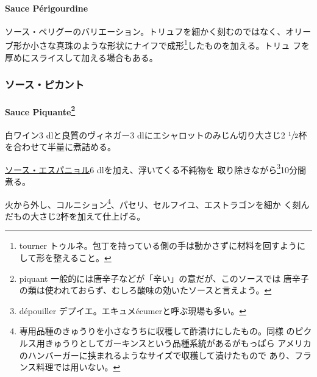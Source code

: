 \hypertarget{sauce-puxe9rigourdine}{%
\paragraph{Sauce Périgourdine}\label{sauce-puxe9rigourdine}}


ソース・ペリグーのバリエーション。トリュフを細かく刻むのではなく、オリー
ブ形か小さな真珠のような形状にナイフで成形\footnote{tourner
  トゥルネ。包丁を持っている側の手は動かさずに材料を回すようにして形を整えること。}したものを加える。トリュ
フを厚めにスライスして加える場合もある。

\maeaki

\hypertarget{ux30bdux30fcux30b9ux30d4ux30abux30f3ux30c8}{%
\subsubsection{ソース・ピカント}\label{ux30bdux30fcux30b9ux30d4ux30abux30f3ux30c8}}

\hypertarget{sauce-piquante}{%
\paragraph[Sauce Piquante]{\texorpdfstring{Sauce Piquante\footnote{piquant
  一般的には唐辛子などが「辛い」の意だが、このソースでは
  唐辛子の類は使われておらず、むしろ酸味の効いたソースと言えよう。}}{Sauce Piquante}}\label{sauce-piquante}}


白ワイン3 dlと良質のヴィネガー3 dlにエシャロットのみじん切り大さじ2
\(\sfrac{1}{2}\)杯を合わせて半量に煮詰める。

\protect\hyperlink{sauce-espagnole}{ソース・エスパニョル}6
dlを加え、浮いてくる不純物を 取り除きながら\footnote{dépouiller
  デプイエ。エキュメécumerと呼ぶ現場も多い。}10分間煮る。

火から外し、コルニション\footnote{専用品種のきゅうりを小さなうちに収穫して酢漬けにしたもの。同様
  のピクルス用きゅうりとしてガーキンスという品種系統があるがもっぱら
  アメリカのハンバーガーに挟まれるようなサイズで収穫して漬けたもので
  あり、フランス料理では用いない。}、パセリ、セルフイユ、エストラゴンを細か
く刻んだもの大さじ2杯を加えて仕上げる。


